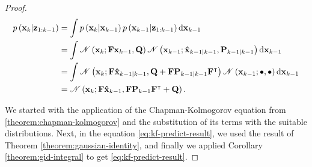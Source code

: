 \begin{proof}
    \begin{align}
        p\left(\vecat{x}{k} | \vecat{z}{1:k-1}\right)
        &= \int
            p\left(
                \vecat{x}{k} | \vecat{x}{k-1}\right)
            p\left(
                \vecat{x}{k-1} | \vecat{z}{1:k-1}
            \right)
            \mathrm{d} \vecat{x}{k-1} \label{eq:kf-pred-s1} \\
        &= \int
            \mathscr{N}\left(
                \vecat{x}{k}; \mathbf{F}\vecat{x}{k-1}, \mathbf{Q}
            \right)
            \mathscr{N}\left(
                \vecat{x}{k-1}; \vecat{\hat{x}}{k-1|k-1}, \vecat{P}{k-1|k-1}
            \right)
            \mathrm{d} \vecat{x}{k-1} \label{eq:kf-pred-s2} \\
        &= \int
            \mathscr{N}\left(
                \vecat{x}{k};
                \mathbf{F} \vecat{\hat{x}}{k-1|k-1},
                \mathbf{Q} + \mathbf{F} \vecat{P}{k-1|k-1} \mathbf{F}^\intercal
            \right)
            \mathscr{N}\left(
                \vecat{x}{k-1}; \bullet, \bullet
            \right)
            \mathrm{d} \vecat{x}{k-1} \label{eq:kf-predict-gauss-id}\\
        &= \mathscr{N}\left(
                \vecat{x}{k};
                \mathbf{F} \vecat{\hat{x}}{k-1},
                \mathbf{F} \vecat{P}{k-1} \mathbf{F}^\intercal + \mathbf{Q}
            \right). \label{eq:kf-predict-result}
    \end{align}

    We started with the application of the Chapman-Kolmogorov equation from \ref{theorem:chapman-kolmogorov} and the substitution of its terms with the suitable distributions. Next, in the equation \ref{eq:kf-predict-result}, we used the result of Theorem \ref{theorem:gaussian-identity}, and finally we applied Corollary \ref{theorem:gid-integral} to get \ref{eq:kf-predict-result}.
\end{proof}

